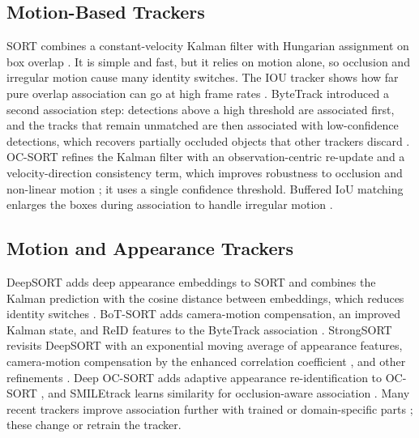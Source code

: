 \subsection{Motion-Based Trackers}
SORT combines a constant-velocity Kalman filter with Hungarian assignment on box overlap \cite{bewley2016sort}. It is simple and fast, but it relies on motion alone, so occlusion and irregular motion cause many identity switches. The IOU tracker shows how far pure overlap association can go at high frame rates \cite{bochinski2017iou}. ByteTrack introduced a second association step: detections above a high threshold are associated first, and the tracks that remain unmatched are then associated with low-confidence detections, which recovers partially occluded objects that other trackers discard \cite{zhang2022bytetrack}. OC-SORT refines the Kalman filter with an observation-centric re-update and a velocity-direction consistency term, which improves robustness to occlusion and non-linear motion \cite{cao2023ocsort}; it uses a single confidence threshold. Buffered IoU matching enlarges the boxes during association to handle irregular motion \cite{yang2023cbiou}.

\subsection{Motion and Appearance Trackers}
DeepSORT adds deep appearance embeddings to SORT and combines the Kalman prediction with the cosine distance between embeddings, which reduces identity switches \cite{wojke2017deepsort}. BoT-SORT adds camera-motion compensation, an improved Kalman state, and ReID features to the ByteTrack association \cite{aharon2022botsort}. StrongSORT revisits DeepSORT with an exponential moving average of appearance features, camera-motion compensation by the enhanced correlation coefficient \cite{evangelidis2008ecc}, and other refinements \cite{du2023strongsort}. Deep OC-SORT adds adaptive appearance re-identification to OC-SORT \cite{maggiolino2023deepocsort}, and SMILEtrack learns similarity for occlusion-aware association \cite{wang2024smiletrack}. Many recent trackers improve association further with trained or domain-specific parts \cite{li2024fdbtrack,bao2024graphmatching,zhang2025sinkhorn,ding2025remot,liang2024motiontrack,sun2026bsr}; these change or retrain the tracker.

